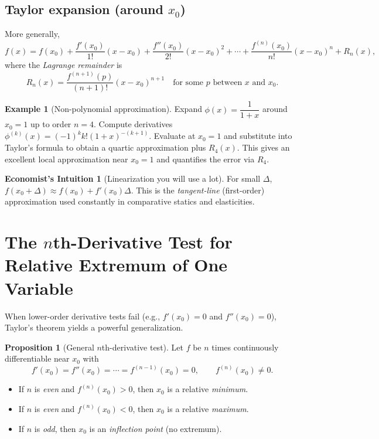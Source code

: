 \documentclass[12pt]{article}
\theoremstyle{definition}
\newtheorem{example}{Example}
\newtheorem{remark}{Economist's Intuition}
\newtheorem{proposition}{Proposition}
\begin{document}
\subsection*{Taylor expansion (around $x_0$)}
More generally,
\[
f(x)= f(x_0)+\frac{f'(x_0)}{1!}(x-x_0)+\frac{f''(x_0)}{2!}(x-x_0)^2+\cdots+\frac{f^{(n)}(x_0)}{n!}(x-x_0)^n+R_n(x),
\]
where the \emph{Lagrange remainder} is
\[
R_n(x)=\frac{f^{(n+1)}(p)}{(n+1)!}(x-x_0)^{n+1}\quad\text{for some }p\text{ between }x\text{ and }x_0.
\]

\begin{example}[Non-polynomial approximation]
Expand $\phi(x)=\dfrac{1}{1+x}$ around $x_0=1$ up to order $n=4$.
Compute derivatives $\phi^{(k)}(x)=(-1)^k k!(1+x)^{-(k+1)}$. Evaluate at $x_0=1$ and substitute into Taylor's formula to obtain a quartic approximation plus $R_4(x)$.
This gives an excellent local approximation near $x_0=1$ and quantifies the error via $R_4$.
\end{example}

\begin{remark}[Linearization you will use a lot]
For small $\Delta$, $f(x_0+\Delta)\approx f(x_0)+f'(x_0)\Delta$. This is the \emph{tangent-line} (first-order) approximation used constantly in comparative statics and elasticities.
\end{remark}

\section{The $n$th-Derivative Test for Relative Extremum of One Variable}
When lower-order derivative tests fail (e.g., $f'(x_0)=0$ and $f''(x_0)=0$), Taylor's theorem yields a powerful generalization.

\begin{proposition}[General $n$th-derivative test]
Let $f$ be $n$ times continuously differentiable near $x_0$ with
\[
f'(x_0)=f''(x_0)=\cdots=f^{(n-1)}(x_0)=0,\qquad f^{(n)}(x_0)\ne0.
\]
\begin{itemize}[leftmargin=1.5em]
\item If $n$ is \emph{even} and $f^{(n)}(x_0)>0$, then $x_0$ is a relative \emph{minimum}.
\item If $n$ is \emph{even} and $f^{(n)}(x_0)<0$, then $x_0$ is a relative \emph{maximum}.
\item If $n$ is \emph{odd}, then $x_0$ is an \emph{inflection point} (no extremum).
\end{itemize}
\end{proposition}
\end{document}

